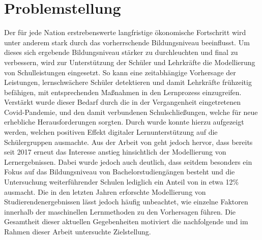 \chapter[Problemstellung]{Problemstellung}

Der für jede Nation erstrebenswerte langfristige ökonomische Fortschritt wird unter anderem stark durch das vorherrschende Bildungsniveau beeinflusst. \cite[S. 1]{Cortez2008UsingDM} 
Um dieses sich ergebende Bildungsniveau stärker zu durchleuchten und final zu verbessern, wird zur Unterstützung der Schüler und Lehrkräfte die Modellierung von Schulleistungen eingesetzt. \cite[S. 1]{Cortez2008UsingDM} 
So kann eine zeitabhängige Vorhersage der Leistungen, lernschwächere Schüler detektieren und damit Lehrkräfte frühzeitig befähigen, mit entsprechenden Maßnahmen in den Lernprozess einzugreifen. \cite[S. 2]{Namoun.2021} 
Verstärkt wurde dieser Bedarf durch die in der Vergangenheit eingetretenen Covid-Pandemie, und den damit verbundenen Schulschließungen, welche für neue erhebliche Herausforderungen sorgten. \cite[S. 2]{Clark.2021} 
Durch \cite[S. 13]{Clark.2021} wurde konnte hierzu aufgezeigt werden, welchen positiven Effekt digitaler Lernunterstützung auf die Schülergruppen ausmachte.
Aus der Arbeit von \cite[S. 9]{Namoun.2021} geht jedoch hervor, dass bereits seit 2017 erneut das Interesse anstieg hinsichtlich der Modellierung von Lernergebnissen. 
Dabei wurde jedoch auch deutlich, dass seitdem besonders ein Fokus auf das Bildungsniveau von Bachelorstudiengängen besteht und die Untersuchung weiterführender Schulen lediglich ein Anteil von in etwa 12\% ausmacht. \cite[S. 11]{Namoun.2021} 
Die in den letzten Jahren erforschte Modellierung von Studierendenergebnissen lässt jedoch häufig unbeachtet, wie einzelne Faktoren innerhalb der maschinellen Lernmethoden zu den Vorhersagen führen. \cite[S. 19]{Namoun.2021}
Die Gesamtheit dieser aktuellen Gegebenheiten motiviert die nachfolgende und im Rahmen dieser Arbeit untersuchte Zielstellung.